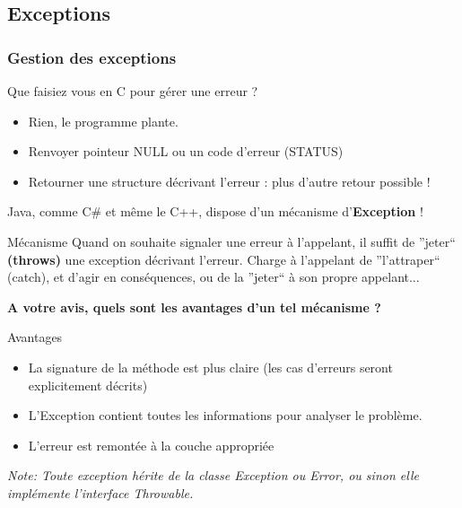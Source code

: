 \documentclass[handout]{beamer}
\begin{document}
\subsection{Exceptions}
\begin{frame}
	\frametitle{Gestion des exceptions}
	\begin{block}{Que faisiez vous en C pour gérer une erreur ?}
		\begin{itemize}
			\item Rien, le programme plante.
			\item Renvoyer pointeur NULL ou un code d'erreur (STATUS)
			\item Retourner une structure décrivant l'erreur : plus d'autre retour possible !
		\end{itemize}
	Java, comme C{\#} et même le C++, dispose d'un mécanisme d'\textbf{Exception} !
	\end{block}	
\end{frame}

\begin{frame}
	\begin{block}{Mécanisme}
		Quand on souhaite signaler une erreur à l'appelant, il suffit de ''jeter`` \textbf{(throws)} une exception décrivant l'erreur. Charge à l'appelant de ''l'attraper`` (catch), et d'agir en conséquences, ou de la ''jeter`` à son propre appelant...
	\end{block}
	\begin{center}
		\textbf{A votre avis, quels sont les avantages d'un tel mécanisme ?}
	\end{center}
\end{frame}

\begin{frame}
	\begin{block}{Avantages}
		\begin{itemize}
			\item La signature de la méthode est plus claire (les cas d'erreurs
				seront explicitement décrits)
			\item L'Exception contient toutes les informations pour analyser le problème.
			\item L'erreur est remontée à la couche appropriée
		\end{itemize}
		\textit{Note: Toute exception hérite de la classe Exception ou Error, ou sinon elle implémente l'interface Throwable.}
	\end{block}
\end{frame}
\end{document}
